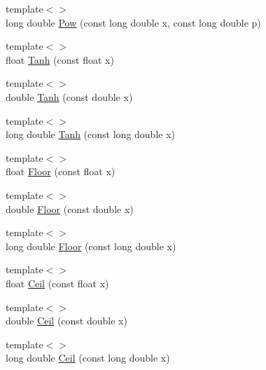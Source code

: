 \begin{DoxyCompactItemize}
\item 
{\footnotesize template$<$$>$ }\\long double \hyperlink{namespace_c_o_n_t_r_a_l_i_g_n_ae1f4a55e11316f304596d3a26869d375}{Pow} (const long double x, const long double p)
\item 
{\footnotesize template$<$$>$ }\\float \hyperlink{namespace_c_o_n_t_r_a_l_i_g_n_acf91d891dabcc9c64740f9f97d3e30d1}{Tanh} (const float x)
\item 
{\footnotesize template$<$$>$ }\\double \hyperlink{namespace_c_o_n_t_r_a_l_i_g_n_a647e44a28c6fa1922856f72076098ae4}{Tanh} (const double x)
\item 
{\footnotesize template$<$$>$ }\\long double \hyperlink{namespace_c_o_n_t_r_a_l_i_g_n_aec2280338a362a451b5d959dc6e2fd97}{Tanh} (const long double x)
\item 
{\footnotesize template$<$$>$ }\\float \hyperlink{namespace_c_o_n_t_r_a_l_i_g_n_a57c956df884afde3839cbcff1a8569a9}{Floor} (const float x)
\item 
{\footnotesize template$<$$>$ }\\double \hyperlink{namespace_c_o_n_t_r_a_l_i_g_n_aad3a78d6112cc443813287d60afa95a2}{Floor} (const double x)
\item 
{\footnotesize template$<$$>$ }\\long double \hyperlink{namespace_c_o_n_t_r_a_l_i_g_n_a80f1355ab7b7bb9ad01c2a1ac800833f}{Floor} (const long double x)
\item 
{\footnotesize template$<$$>$ }\\float \hyperlink{namespace_c_o_n_t_r_a_l_i_g_n_afd0532ccadde7e7c48ee5bcc64693122}{Ceil} (const float x)
\item 
{\footnotesize template$<$$>$ }\\double \hyperlink{namespace_c_o_n_t_r_a_l_i_g_n_ac39c37f6c9451024a010d4821c1c1607}{Ceil} (const double x)
\item 
{\footnotesize template$<$$>$ }\\long double \hyperlink{namespace_c_o_n_t_r_a_l_i_g_n_aa275ad45d22c758e8f3a98f0804f91ea}{Ceil} (const long double x)
\end{DoxyCompactItemize}
